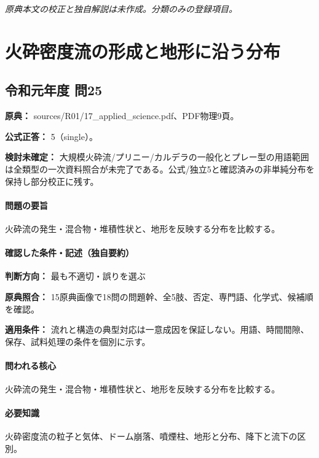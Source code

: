 \par\textit{原典本文の校正と独自解説は未作成。分類のみの登録項目。}

\section{火砕密度流の形成と地形に沿う分布}

\subsection{令和元年度 問25}
\label{q:r01-reg-applied-25}

\noindent\textbf{原典：} sources/R01/17\_applied\_science.pdf、PDF物理9頁。

\textbf{公式正答：} 5（single）。

\par\textbf{検討未確定：} 大規模火砕流/プリニー/カルデラの一般化とプレー型の用語範囲は全類型の一次資料照合が未完了である。公式/独立5と確認済みの非単純分布を保持し部分校正に残す。

\paragraph{問題の要旨} 火砕流の発生・混合物・堆積性状と、地形を反映する分布を比較する。

\paragraph{確認した条件・記述（独自要約）}\mbox{}\par

\noindent\textbf{判断方向：} 最も不適切・誤りを選ぶ\par

\noindent\textbf{原典照合：} 15原典画像で18問の問題幹、全5肢、否定、専門語、化学式、候補順を確認。\par

\noindent\textbf{適用条件：} 流れと構造の典型対応は一意成因を保証しない。用語、時間間隙、保存、試料処理の条件を個別に示す。\par

\paragraph{問われる核心} 火砕流の発生・混合物・堆積性状と、地形を反映する分布を比較する。

\paragraph{必要知識} 火砕密度流の粒子と気体、ドーム崩落、噴煙柱、地形と分布、降下と流下の区別。

